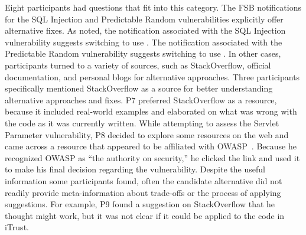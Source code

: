 \documentclass{acm_proc_article-sp}
\begin{document}
 
Eight participants had questions that fit into this category. 
The FSB notifications for the SQL Injection and Predictable Random vulnerabilities explicitly offer alternative fixes. 
As noted, the notification associated with the SQL Injection vulnerability suggests switching to use . 
The notification associated with the Predictable Random vulnerability suggests switching to use . 
In other cases, participants turned to a variety of sources, such as StackOverflow, official documentation, and personal blogs for alternative approaches. 
Three participants specifically mentioned StackOverflow as a source for better understanding alternative approaches and fixes. 
P7 preferred StackOverflow as a resource, because it included real-world examples and elaborated on what was wrong with the code as it was currently written.  
While attempting to assess the Servlet Parameter vulnerability, P8 decided to explore some resources on the web and came across a resource that appeared to be affiliated with OWASP~\cite{OWASP}. 
Because he recognized OWASP as ``the authority on security,'' he clicked the link and used it to make his final decision regarding the vulnerability. 
Despite the useful information some participants found, often the candidate alternative did not readily provide meta-information about trade-offs or the process of applying suggestions. 
For example, P9 found a suggestion on StackOverflow that he thought might work, but it was not clear if it could be applied to the code in iTrust. 






\end{document}
